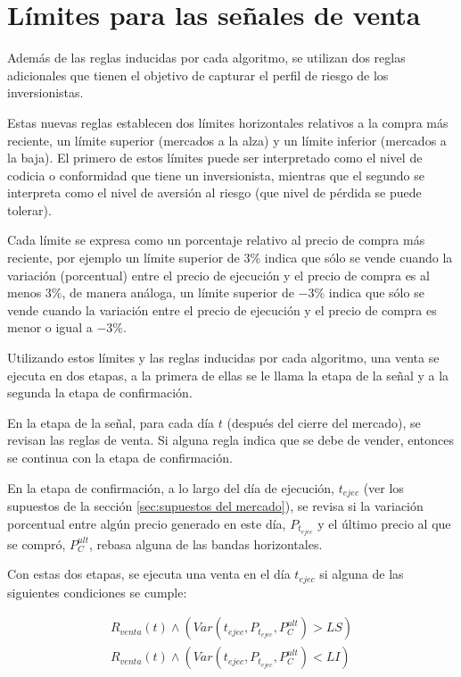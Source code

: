 \documentclass[12pt]{report}
\theoremstyle{break}
\theoremstyle{break}
\begin{document}
\section{Límites para las señales de venta}
\label{seccion:limites ventas}
Además de las reglas inducidas por cada algoritmo, se utilizan dos reglas adicionales que tienen el objetivo de capturar el perfil de riesgo de los inversionistas.

Estas nuevas reglas establecen dos límites horizontales relativos a la compra más reciente, un límite superior (mercados a la alza) y un límite inferior (mercados a la baja). El primero de estos límites puede ser interpretado como el nivel de codicia o conformidad que tiene un inversionista, mientras que el segundo se interpreta como el nivel de aversión al riesgo (que nivel de pérdida se puede tolerar).

Cada límite se expresa como un porcentaje relativo al precio de compra más reciente, por ejemplo un límite superior de $3\%$ indica que sólo se vende cuando la variación (porcentual) entre el precio de ejecución y el precio de compra es al menos $3\%$, de manera análoga, un límite superior de $-3\%$ indica que sólo se vende cuando la variación entre el precio de ejecución y el precio de compra es menor o igual a $-3\%$.

Utilizando estos límites y las reglas inducidas por cada algoritmo, una venta se ejecuta en dos etapas, a la primera de ellas se le llama la etapa de la señal y a la segunda la etapa de confirmación.

En la etapa de la señal, para cada día $t$ (después del cierre del mercado), se revisan las reglas de venta. Si alguna regla indica que se debe de vender, entonces se continua con la etapa de confirmación.

En la etapa de confirmación, a lo largo del día de ejecución, $t_{ejec}$ (ver los supuestos de la sección \ref{sec:supuestos del mercado}), se revisa si la variación porcentual entre algún precio generado en este día, $P_{t_{ejec}}$ y el último precio al que se compró, $P_{C}^{ult}$, rebasa alguna de las bandas horizontales.

Con estas dos etapas, se ejecuta una venta en el día $t_{ejec}$ si alguna de las siguientes condiciones se cumple:

\begin{align}
R_{venta}(t) \wedge (Var(t_{ejec}, P_{t_{ejec}}, P_{C}^{ult} ) > LS) \label{eqn:Venta limite sup}\\
R_{venta}(t) \wedge (Var(t_{ejec}, P_{t_{ejec}}, P_{C}^{ult} ) < LI) \label{eqn:Venta limite inf}
\end{align}
\end{document}
